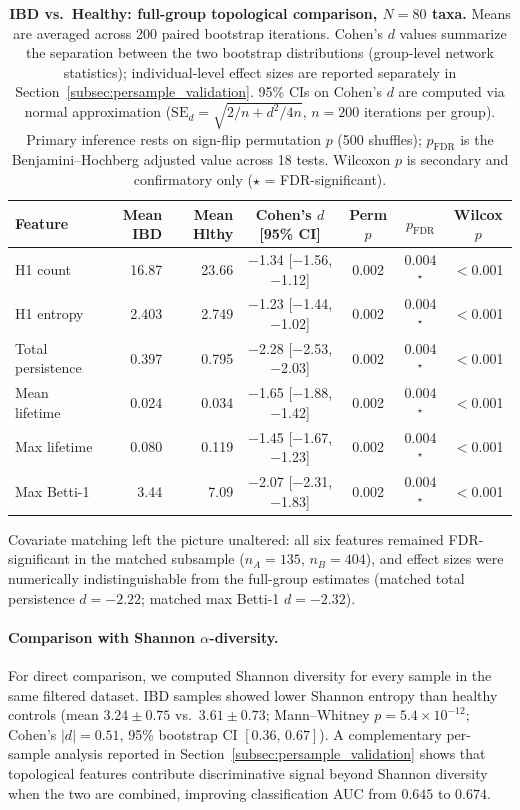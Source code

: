 \begin{table}[H]
\centering
\caption{%
  \textbf{IBD vs.\ Healthy: full-group topological comparison, $N = 80$ taxa.}
  Means are averaged across 200 paired bootstrap iterations.
  Cohen's $d$ values summarize the separation between the two bootstrap
  distributions (group-level network statistics); individual-level effect
  sizes are reported separately in Section~\ref{subsec:persample_validation}.
  95\% CIs on Cohen's $d$ are computed via normal approximation
  ($\text{SE}_d = \sqrt{2/n + d^2 / 4n}$, $n = 200$ iterations per group).
  Primary inference rests on sign-flip permutation $p$ (500 shuffles);
  $p_{\text{FDR}}$ is the Benjamini--Hochberg adjusted value across 18 tests.
  Wilcoxon $p$ is secondary and confirmatory only ($\star$ = FDR-significant).
}
\label{tab:ibd_results}
\small
\setlength{\tabcolsep}{4.5pt}
\begin{tabular}{lrrcccc}
\toprule
\textbf{Feature} & \textbf{Mean IBD} & \textbf{Mean Hlthy}
  & \textbf{Cohen's $d$ [95\% CI]} & \textbf{Perm $p$}
  & \boldmath$p_{\text{FDR}}$ & \textbf{Wilcox $p$} \\
\midrule
H1 count          & 16.87 & 23.66 & $-$1.34 [$-$1.56, $-$1.12] & 0.002 & 0.004$^\star$ & $<$0.001 \\
H1 entropy        & 2.403 & 2.749 & $-$1.23 [$-$1.44, $-$1.02] & 0.002 & 0.004$^\star$ & $<$0.001 \\
Total persistence & 0.397 & 0.795 & $-$2.28 [$-$2.53, $-$2.03] & 0.002 & 0.004$^\star$ & $<$0.001 \\
Mean lifetime     & 0.024 & 0.034 & $-$1.65 [$-$1.88, $-$1.42] & 0.002 & 0.004$^\star$ & $<$0.001 \\
Max lifetime      & 0.080 & 0.119 & $-$1.45 [$-$1.67, $-$1.23] & 0.002 & 0.004$^\star$ & $<$0.001 \\
Max Betti-1       & 3.44  & 7.09  & $-$2.07 [$-$2.31, $-$1.83] & 0.002 & 0.004$^\star$ & $<$0.001 \\
\bottomrule
\end{tabular}
\end{table}

Covariate matching left the picture unaltered: all six features remained
FDR-significant in the matched subsample ($n_A = 135$, $n_B = 404$), and
effect sizes were numerically indistinguishable from the full-group estimates
(matched total persistence $d = -2.22$; matched max Betti-1 $d = -2.32$).

\paragraph{Comparison with Shannon $\alpha$-diversity.}
For direct comparison, we computed Shannon diversity for every sample in
the same filtered dataset.
IBD samples showed lower Shannon entropy than healthy controls (mean
$3.24 \pm 0.75$ vs.\ $3.61 \pm 0.73$; Mann--Whitney
$p = 5.4 \times 10^{-12}$; Cohen's $|d| = 0.51$, 95\% bootstrap CI
$[0.36,\, 0.67]$).
A complementary per-sample analysis reported in
Section~\ref{subsec:persample_validation} shows that topological features
contribute discriminative signal beyond Shannon diversity when the two are
combined, improving classification AUC from $0.645$ to $0.674$.

